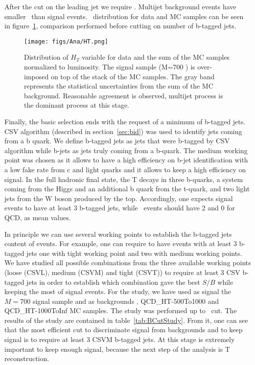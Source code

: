 After the cut on the leading jet \pt we require . Multijet background events have smaller \HT~than signal events. \HT~distribution for data and MC samples can be seen in figure~\ref{fig:HT}, comparison performed before cutting on number of b-tagged jets.

\begin{figure}[!Hhtbp]
  \begin{center}
    \texttt{[image: figs/Ana/HT.png]}
    \caption{Distribution of $H_{T}$ variable for data and the sum of the MC samples normalized to luminosity. The signal sample (M=700 \GeVcc) is over-imposed on top of the stack of the MC samples. The gray band represents the statistical uncertainties from the sum of the MC background. Reasonable agreement is observed, multijet process is the dominant process at this stage.}
    \label{fig:HT}
  \end{center}
\end{figure}

Finally, the basic selection ends with the request of a minimum of b-tagged jets. CSV algorithm (described in section~\ref{sec:bid}) was used to identify jets coming from a b quark. We define b-tagged jets as jets that were b-tagged by CSV algorithm while b-jets as jets truly coming from a b-quark. The medium working point was chosen as it allows to have a high efficiency on b-jet identification with a low fake rate from c and light quarks and it allows to keep a high efficiency on signal. In the full hadronic final state, the T decays in three b-quarks, a \bbbar system coming from the Higgs and an additional b quark from the t-quark, and two light jets from the W boson produced by the top. Accordingly, one expects signal events to have at least 3 b-tagged jets, while \ttbar~events should have 2 and 0 for QCD, as mean values.

In principle we can use several working points to establish the b-tagged jets content of events. For example, one can require to have events with at least 3 b-tagged jets one with tight working point and two with medium working points. We have studied all possible combinations from the three available working points (loose (CSVL), medium (CSVM) and tight (CSVT)) to require at least 3 CSV b-tagged jets in order to establish which combination gave the best $S/B$ while keeping the most of signal events. For the study, we have used as signal the $M=700$ \GeVcc signal sample and as backgrounds \ttbar, QCD\_HT-500To1000 and QCD\_HT-1000ToInf MC samples. The study was performed up to \HT~cut. The results of the study are contained in table~\ref{tab:BCutStudy}. From it, one can see that the most efficient cut to discriminate signal from backgrounds and to keep signal is to require at least 3 CSVM b-tagged jets. At this stage is extremely important to keep enough signal, because the next step of the analysis is T reconstruction.

